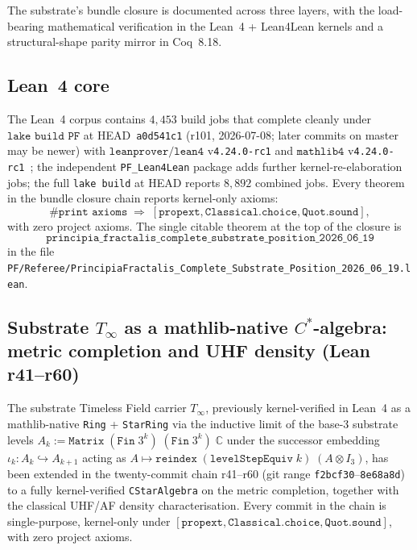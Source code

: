 \documentclass[11pt,a4paper]{amsart}
\theoremstyle{plain}
\theoremstyle{definition}
\begin{document}
The substrate's bundle closure is documented across three layers, with the load-bearing mathematical verification in the Lean~4 + Lean4Lean kernels and a structural-shape parity mirror in Coq~8.18.

\subsection{Lean~4 core}

The Lean~4 corpus contains $4{,}453$ build jobs that complete cleanly under $\texttt{lake build PF}$ at HEAD~\texttt{a0d541c1} (r101, 2026-07-08; later commits on master may be newer) with $\texttt{leanprover/lean4}$ v\texttt{4.24.0-rc1} and $\texttt{mathlib4}$ v\texttt{4.24.0-rc1}~\cite{moura-ullrich2021,mathlib2020}; the independent \texttt{PF\_Lean4Lean} package adds further kernel-re-elaboration jobs; the full \texttt{lake build} at HEAD reports $8{,}892$ combined jobs. Every theorem in the bundle closure chain reports kernel-only axioms:
\[
\texttt{\#print axioms} \;\Longrightarrow\; [\texttt{propext}, \texttt{Classical.choice}, \texttt{Quot.sound}],
\]
with zero project axioms. The single citable theorem at the top of the closure is
\[
\texttt{principia\_fractalis\_complete\_substrate\_position\_2026\_06\_19}
\]
in the file \texttt{PF/Referee/PrincipiaFractalis\_Complete\_Substrate\_Position\_2026\_06\_19.lean}.

\subsection{Substrate \texorpdfstring{$T_\infty$}{T\_infty} as a mathlib-native \texorpdfstring{$C^*$}{C*}-algebra: metric completion and UHF density (Lean r41--r60)}\label{subsec:substrate-cstar-completion}

The substrate Timeless Field carrier $T_\infty$, previously kernel-verified in Lean~4 as a mathlib-native \texttt{Ring} + \texttt{StarRing} via the inductive limit of the base-3 substrate levels $A_k := \texttt{Matrix}\;(\texttt{Fin}\;3^k)\;(\texttt{Fin}\;3^k)\;\mathbb{C}$ under the successor embedding $\iota_k : A_k \hookrightarrow A_{k+1}$ acting as $A \mapsto \texttt{reindex}\;(\texttt{levelStepEquiv}\;k)\;(A \otimes I_3)$, has been extended in the twenty-commit chain r41--r60 (git range \texttt{f2bcf30}--\texttt{8e68a8d}) to a fully kernel-verified \texttt{CStarAlgebra} on the metric completion, together with the classical UHF/AF density characterisation. Every commit in the chain is single-purpose, kernel-only under $[\texttt{propext}, \texttt{Classical.choice}, \texttt{Quot.sound}]$, with zero project axioms.
\end{document}
